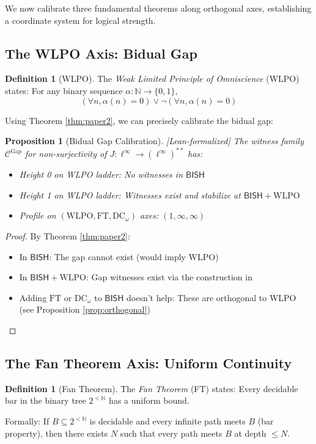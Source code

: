 \documentclass[11pt]{article}
\theoremstyle{plain}
\newtheorem{proposition}[theorem]{Proposition}
\theoremstyle{definition}
\newtheorem{definition}[theorem]{Definition}
\newcommand{\N}{\mathbb{N}}
\newcommand{\WLPO}{\mathrm{WLPO}}
\newcommand{\FT}{\mathrm{FT}}
\newcommand{\DCw}{\mathrm{DC}_\omega}
\newcommand{\BISH}{\mathsf{BISH}}
\newcommand{\linf}{\ell^\infty}
\newcommand{\leanok}{\textsf{\textcolor{green!70!black}{[Lean-formalized]}}}
\begin{document}
We now calibrate three fundamental theorems along orthogonal axes, establishing a coordinate system for logical strength.

\subsection{The WLPO Axis: Bidual Gap}

\begin{definition}[WLPO]\label{def:wlpo}
The \emph{Weak Limited Principle of Omniscience} (WLPO) states: For any binary sequence $\alpha: \N \to \{0,1\}$,
\[
(\forall n, \alpha(n) = 0) \vee \neg(\forall n, \alpha(n) = 0)
\]
\end{definition}

Using Theorem \ref{thm:paper2}, we can precisely calibrate the bidual gap:

\begin{proposition}[Bidual Gap Calibration]\label{prop:gap-height} \leanok
The witness family $\mathcal{C}^{\text{Gap}}$ for non-surjectivity of $J: \linf \to (\linf)^{**}$ has:
\begin{itemize}
\item Height 0 on WLPO ladder: No witnesses in $\BISH$
\item Height 1 on WLPO ladder: Witnesses exist and stabilize at $\BISH + \WLPO$
\item Profile on $(\WLPO, \FT, \DCw)$ axes: $(1, \infty, \infty)$
\end{itemize}
\end{proposition}

\begin{proof}
By Theorem \ref{thm:paper2}:
\begin{itemize}
\item In $\BISH$: The gap cannot exist (would imply WLPO)
\item In $\BISH + \WLPO$: Gap witnesses exist via the construction in \cite{Paper2}
\item Adding $\FT$ or $\DCw$ to $\BISH$ doesn't help: These are orthogonal to WLPO (see Proposition \ref{prop:orthogonal})
\end{itemize}
\end{proof}

\subsection{The Fan Theorem Axis: Uniform Continuity}

\begin{definition}[Fan Theorem]\label{def:ft}
The \emph{Fan Theorem} (FT) states: Every decidable bar in the binary tree $2^{<\N}$ has a uniform bound.

Formally: If $B \subseteq 2^{<\N}$ is decidable and every infinite path meets $B$ (bar property), then there exists $N$ such that every path meets $B$ at depth $\leq N$.
\end{definition}
\end{document}
